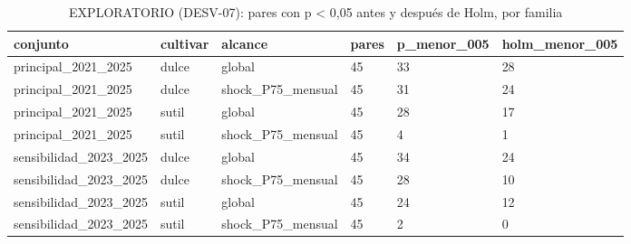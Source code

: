 \begin{table}[H]
\centering
\small
\caption{EXPLORATORIO (DESV-07): pares con p < 0,05 antes y después de Holm, por familia}
\label{tab:T09_holm_resumen}
\begin{tabular}{llllll}
\toprule
conjunto & cultivar & alcance & pares & p\_menor\_005 & holm\_menor\_005 \\
\midrule
principal\_2021\_2025 & dulce & global & 45 & 33 & 28 \\
principal\_2021\_2025 & dulce & shock\_P75\_mensual & 45 & 31 & 24 \\
principal\_2021\_2025 & sutil & global & 45 & 28 & 17 \\
principal\_2021\_2025 & sutil & shock\_P75\_mensual & 45 & 4 & 1 \\
sensibilidad\_2023\_2025 & dulce & global & 45 & 34 & 24 \\
sensibilidad\_2023\_2025 & dulce & shock\_P75\_mensual & 45 & 28 & 10 \\
sensibilidad\_2023\_2025 & sutil & global & 45 & 24 & 12 \\
sensibilidad\_2023\_2025 & sutil & shock\_P75\_mensual & 45 & 2 & 0 \\
\bottomrule
\end{tabular}
\end{table}